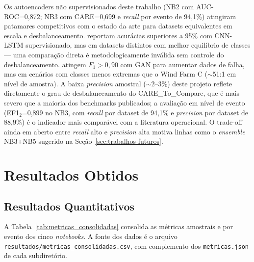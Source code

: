 \documentclass[12pt]{article}
\begin{document}
Os autoencoders não supervisionados deste trabalho (NB2 com AUC-ROC=0,872; NB3 com CARE=0,699 e \textit{recall} por evento de 94,1\%) atingiram patamares competitivos com o estado da arte para datasets equivalentes em escala e desbalanceamento. \citet{Gebreamlak2024_CNN_LSTM_Thesis} reportam acurácias superiores a 95\% com CNN-LSTM supervisionado, mas em datasets distintos com melhor equilíbrio de classes --- uma comparação direta é metodologicamente inválida sem controle do desbalanceamento. \citet{Wang2025_SCADA} atingem $F_1 > 0{,}90$ com GAN para aumentar dados de falha, mas em cenários com classes menos extremas que o Wind Farm C ($\sim$51:1 em nível de amostra). A baixa \textit{precision} amostral ($\sim$2--3\%) deste projeto reflete diretamente o grau de desbalanceamento do CARE\_To\_Compare, que é mais severo que a maioria dos benchmarks publicados; a avaliação em nível de evento (EF1$_2$=0,899 no NB3, com \textit{recall} por dataset de 94,1\% e \textit{precision} por dataset de 88,9\%) é o indicador mais comparável com a literatura operacional. O trade-off ainda em aberto entre \textit{recall} alto e \textit{precision} alta motiva linhas como o \textit{ensemble} NB3+NB5 sugerido na Seção~\ref{sec:trabalhos-futuros}.

\section{Resultados Obtidos}\label{sec:resultados-obtidos}

\subsection{Resultados Quantitativos}

A Tabela~\ref{tab:metricas_consolidadas} consolida as métricas amostrais e por evento dos cinco \textit{notebooks}. A fonte dos dados é o arquivo \texttt{resultados/metricas\_consolidadas.csv}, com complemento dos \texttt{metricas.json} de cada subdiretório.
\end{document}

